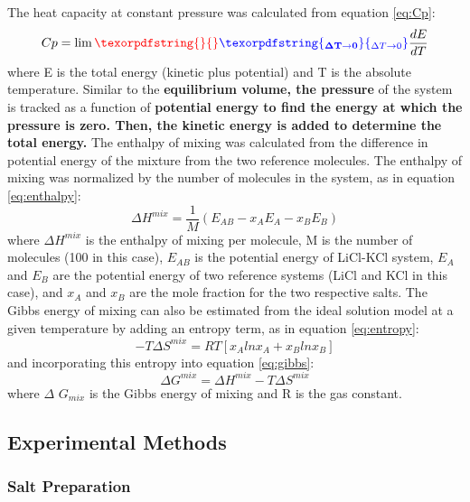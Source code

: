 \documentclass[review]{elsarticle}
\providecommand{\DIFaddtex}[1]{{\bf #1}} %
\providecommand{\DIFdeltex}[1]{} %
\providecommand{\DIFaddbegin}{\protect\color{blue}} %
\providecommand{\DIFaddend}{\protect\color{black}} %
\providecommand{\DIFdelbegin}{\protect\color{red}} %
\providecommand{\DIFdelend}{\protect\color{black}} %
\providecommand{\DIFadd}[1]{\texorpdfstring{\DIFaddtex{#1}}{#1}} %
\providecommand{\DIFdel}[1]{\texorpdfstring{\DIFdeltex{#1}}{}} %
\newcommand{\DIFscaledelfig}{0.5}
\newlength{\DIFdelgraphicswidth} %
\newlength{\DIFdelgraphicsheight} %
\newcommand{\DIFaddincludegraphics}[2][]{{\color{blue}\fbox{\DIFOincludegraphics[#1]{#2}}}} %
\newcommand{\DIFdelincludegraphics}[2][]{%
\sbox{\DIFdelgraphicsbox}{\DIFOincludegraphics[#1]{#2}}%
\settoboxwidth{\DIFdelgraphicswidth}{\DIFdelgraphicsbox} %
\settoboxtotalheight{\DIFdelgraphicsheight}{\DIFdelgraphicsbox} %
\scalebox{\DIFscaledelfig}{%
\parbox[b]{\DIFdelgraphicswidth}{\usebox{\DIFdelgraphicsbox}\\[-\baselineskip] \rule{\DIFdelgraphicswidth}{0em}}\llap{\resizebox{\DIFdelgraphicswidth}{\DIFdelgraphicsheight}{%
\setlength{\unitlength}{\DIFdelgraphicswidth}%
\begin{picture}(1,1)%
\thicklines\linethickness{2pt} %
{\color[rgb]{1,0,0}\put(0,0){\framebox(1,1){}}}%
{\color[rgb]{1,0,0}\put(0,0){\line( 1,1){1}}}%
{\color[rgb]{1,0,0}\put(0,1){\line(1,-1){1}}}%
\end{picture}%
}\hspace*{3pt}}} %
} %
\DeclareRobustCommand{\DIFaddbegin}{\DIFOaddbegin \let\includegraphics\DIFaddincludegraphics} %
\DeclareRobustCommand{\DIFaddend}{\DIFOaddend \let\includegraphics\DIFOincludegraphics} %
\DeclareRobustCommand{\DIFdelbegin}{\DIFOdelbegin \let\includegraphics\DIFdelincludegraphics} %
\DeclareRobustCommand{\DIFdelend}{\DIFOaddend \let\includegraphics\DIFOincludegraphics} %
\begin{document}
The heat capacity at constant pressure was calculated from equation \ref{eq:Cp}:
\begin{equation}
\label{eq:Cp}
Cp =\lim\DIFdelbegin \DIFdel{_{T\to0} }\DIFdelend \DIFaddbegin \DIFadd{_{\Delta T\to0} }\DIFaddend \frac{dE}{dT}
\end{equation}
where E is the total energy (kinetic plus potential) and T is the absolute temperature. Similar to the \DIFdelbegin \DIFdel{pressure, the total energy }\DIFdelend \DIFaddbegin \DIFadd{equilibrium volume, the pressure }\DIFaddend of the system is tracked as a function of \DIFdelbegin \DIFdel{time and averaged over the final four ps of the simulation. }\DIFdelend \DIFaddbegin \DIFadd{potential energy to find the energy at which the pressure is zero. Then, the kinetic energy is added to determine the total energy. }\DIFaddend The enthalpy of mixing was calculated from the difference in potential energy of the mixture from the two reference molecules. The enthalpy of mixing was normalized by the number of molecules in the system, as in equation \ref{eq:enthalpy}:
\begin{equation}
    \label{eq:enthalpy}
    \Delta H^{mix} = \frac{1}{M}(E_{AB} - x_A E_A - x_B E_B)
\end{equation} 
where $\Delta H^{mix}$ is the enthalpy of mixing per molecule, M is the number of molecules (100 in this case), $E_{AB}$ is the potential energy of LiCl-KCl system, $E_A$ and $E_B$ are the potential energy of two reference systems (LiCl and KCl in this case), and $x_A$ and $x_B$ are the mole fraction for the two respective salts. The Gibbs energy of mixing can also be estimated from the ideal solution model \cite{dehoff2006} at a given temperature by adding an entropy term, as in equation \ref{eq:entropy}: 
\begin{equation}
    \label{eq:entropy}
    -T \Delta S^{mix}= RT[x_A ln x_A + x_B ln x_B]
\end{equation}and incorporating this entropy into  equation \ref{eq:gibbs}:
\begin{equation}
    \label{eq:gibbs}
    \Delta G^{mix} = \Delta H^{mix} -T \Delta S^{mix}
\end{equation}
where $\Delta$ $G_{mix}$ is the Gibbs energy of mixing and R is the gas constant.


\subsection{Experimental Methods}

\DIFaddbegin \subsubsection{\DIFadd{Salt Preparation}}
\end{document}
